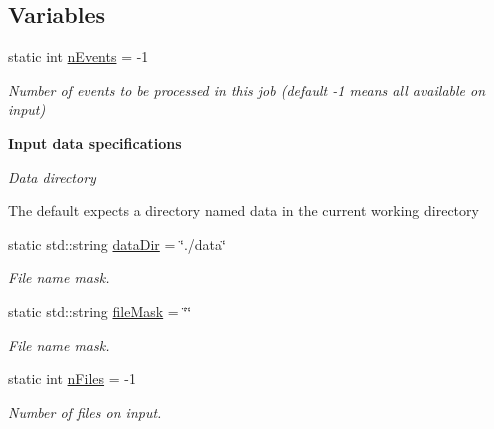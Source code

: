 \subsection*{Variables}
\begin{DoxyCompactItemize}
\item 
static int \hyperlink{namespaceAnalysis_1_1Config_1_1Input_a6b14e2a15595b34711b62b77d22cd759}{n\+Events} = -\/1
\begin{DoxyCompactList}\small\item\em Number of events to be processed in this job (default -\/1 means all available on input) \end{DoxyCompactList}\end{DoxyCompactItemize}
\begin{Indent}{\bf Input data specifications}\par
{\em Data directory

The default expects a directory named {\ttfamily data} in the current working directory }\begin{DoxyCompactItemize}
\item 
static std\+::string \hyperlink{namespaceAnalysis_1_1Config_1_1Input_a73db141eb393d7a7835899cf5e857b2d}{data\+Dir} = \char`\"{}./data\char`\"{}
\begin{DoxyCompactList}\small\item\em File name mask. \end{DoxyCompactList}\item 
static std\+::string \hyperlink{namespaceAnalysis_1_1Config_1_1Input_a899bf3cd0603807b96f93b2ff5e58311}{file\+Mask} = \char`\"{}\char`\"{}
\begin{DoxyCompactList}\small\item\em File name mask. \end{DoxyCompactList}\item 
static int \hyperlink{namespaceAnalysis_1_1Config_1_1Input_a3b76605b518ed07f9f6984fb80f40039}{n\+Files} = -\/1
\begin{DoxyCompactList}\small\item\em Number of files on input. \end{DoxyCompactList}\end{DoxyCompactItemize}
\end{Indent}

